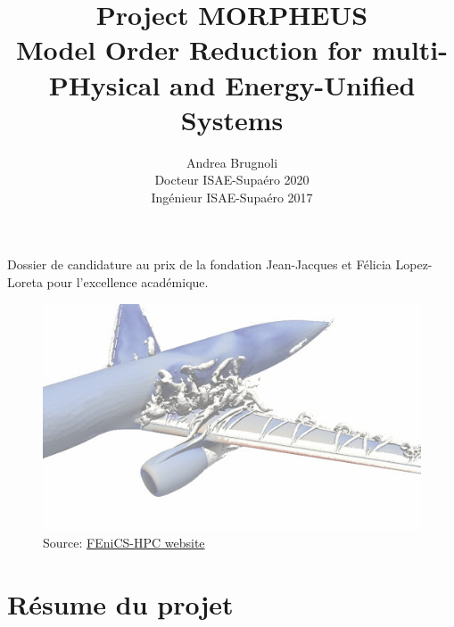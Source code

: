 \documentclass[12pt, french]{article}
\author{Andrea Brugnoli \\ 
\hspace{2.8pt} Docteur ISAE-Supaéro 2020\\
Ingénieur ISAE-Supaéro 2017}
\title{Project MORPHEUS \\
\vspace{.3cm}
\Large{Model Order Reduction for multi-PHysical and Energy-Unified Systems}  }
\date{}
\begin{document}
\maketitle

\large{Dossier de candidature au prix de la fondation Jean-Jacques et Félicia
	Lopez-Loreta pour l'excellence académique.}


\begin{figure}[h]
	\centering
	\includegraphics[width=.95\textwidth]{3Dplane.jpg}
	\captionsetup{labelformat=empty}
	\caption{Source: \href{http://www.fenics-hpc.org/}{FEniCS-HPC website}}
\end{figure}





\thispagestyle{empty}

\newpage

\section{Résume du projet}
\end{document}
